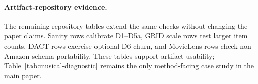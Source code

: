 \paragraph{Artifact-repository evidence.}
The remaining repository tables extend the same checks without changing the
paper claims. Sanity rows calibrate D1--D5a, GRID scale rows test larger item
counts, DACT rows exercise optional D6 churn, and MovieLens rows check
non-Amazon schema portability. These tables support artifact usability;
Table~\ref{tab:musical-diagnostic} remains the only method-facing case study in
the main paper.
